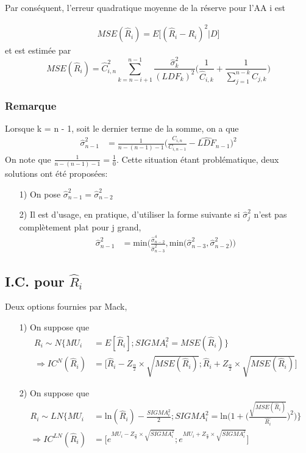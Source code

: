 \documentclass[11pt,french]{report}
\begin{document}
Par conséquent, l'erreur quadratique moyenne de la réserve pour l'AA i est

\begin{align*}
MSE(\widehat{R}_i) =E \big[ (\widehat{R}_i - R_i)^2 | D \big]
\end{align*}
et est estimée par
\begin{equation}
MSE(\widehat{R}_i) = \widehat{C}_{i,n}^2 \sum_{k = n - i + 1}^{n-1} \frac{\widehat{\sigma}_k^2}{(LDF_k)^2} \Bigg( \frac{1}{\widehat{C}_{i,k}} + \frac{1}{\sum_{j=1}^{n-k}C_{j,k}}\Bigg)
\end{equation}
\subsubsection*{Remarque}
Lorsque k = n - 1, soit le dernier terme de la somme, on a que
\begin{align*}
\widehat{\sigma}_{n-1}^2 &= \frac{1}{n-(n-1)-1} \Bigg( \frac{C_{i,n}}{C_{i,n-1}} - \widehat{LDF}_{n-1}\Bigg)^2
\end{align*}
On note que $\frac{1}{n-(n-1)-1} = \frac{1}{0}$. Cette situation étant problématique, deux solutions ont été proposées:
\begin{itemize}
\item[1)] On pose $\widehat{\sigma}_{n-1}^2 = \widehat{\sigma}_{n-2}^2$
\item[2)] Il est d'usage, en pratique, d'utiliser la forme suivante si $\widehat{\sigma}_{j}^2$ n'est pas complètement plat pour j grand,
\begin{align*}
\widehat{\sigma}_{n-1}^2 &= \text{min} \Bigg( \frac{\widehat{\sigma}_{n-2}^4}{\widehat{\sigma}_{n-3}^2}, \text{min} \Big( \widehat{\sigma}_{n-3}^2, \widehat{\sigma}_{n-2}^2 \Big) \Bigg)
\end{align*}
\end{itemize}

\subsection*{I.C. pour $\widehat{R}_i$}
Deux options fournies par Mack,
\begin{itemize}
\item[1)] On suppose que 
\begin{align*}
R_i \sim N \bigg\lbrace MU_i &= E[\widehat{R}_i]; SIGMA_i^2 = MSE(\widehat{R}_i) \bigg\rbrace \\
\Rightarrow IC^N(\widehat{R}_i) &= \bigg[ \widehat{R}_i - Z_{\frac{\alpha}{2}} \times \sqrt{MSE(\widehat{R}_i)}; \widehat{R}_i + Z_{\frac{\alpha}{2}} \times \sqrt{MSE(\widehat{R}_i)} \bigg]
\end{align*}
\item[2)] On suppose que 
\begin{align*}
R_i \sim LN \Bigg\lbrace MU_i &= \text{ln}(\widehat{R}_i) - \frac{SIGMA_i^2}{2}; SIGMA_i^2 = \text{ln} \Bigg( 1 + \Bigg( \frac{\sqrt{MSE(\widehat{R}_i)}}{\widehat{R_i}}\Bigg)^2 \Bigg) \Bigg\rbrace \\
\Rightarrow IC^{LN}(\widehat{R}_i) &= \Bigg[ e^{MU_i - Z_{\frac{\alpha}{2}} \times \sqrt{SIGMA_i^2}}; e^{MU_i + Z_{\frac{\alpha}{2}} \times \sqrt{SIGMA_i^2}} \Bigg]
\end{align*}
\end{itemize}
\end{document}
